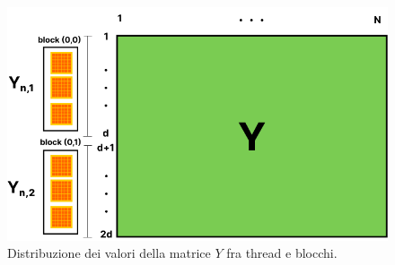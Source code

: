 \begin{figure}[ht!]
    \centering
    \includegraphics[scale=0.35]{img/YwBlocks.png}
    \caption{Distribuzione dei valori della matrice $Y$ fra thread e blocchi.}
    \label{fig:matrixYstructure}
\end{figure}